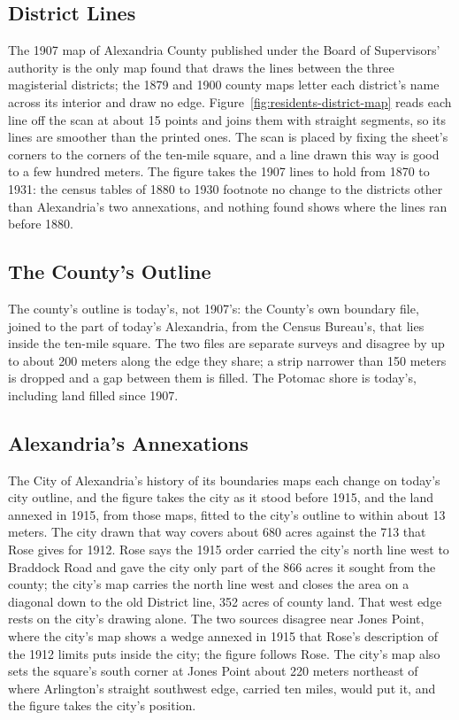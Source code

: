 \subsection{District Lines}
The 1907 map of Alexandria County published under the Board of Supervisors' authority
is the only map found that draws the lines between the three magisterial districts; the
1879 and 1900 county maps letter each district's name across its interior and draw no
edge.\autocite{noetzel1907} Figure~\ref{fig:residents-district-map} reads each line off
the scan at about 15 points and joins them with straight segments, so its lines are
smoother than the printed ones. The scan is placed by fixing the sheet's corners to the
corners of the ten-mile square, and a line drawn this way is good to a few hundred
meters. The figure takes the 1907 lines to hold from 1870 to 1931: the census tables of
1880 to 1930 footnote no change to the districts other than Alexandria's two
annexations, and nothing found shows where the lines ran before 1880.

\subsection{The County's Outline}
The county's outline is today's, not 1907's: the County's own boundary file, joined to
the part of today's Alexandria, from the Census Bureau's, that lies inside the ten-mile
square. The two files are separate surveys and disagree by up to about 200 meters along
the edge they share; a strip narrower than 150 meters is dropped and a gap between them
is filled. The Potomac shore is today's, including land filled since 1907.

\subsection{Alexandria's Annexations}
The City of Alexandria's history of its boundaries maps each change on today's city
outline, and the figure takes the city as it stood before 1915, and the land annexed in
1915, from those maps, fitted to the city's outline to within about 13
meters.\autocite[3]{alexandria2024} The city drawn that way covers about 680 acres
against the 713 that Rose gives for 1912.\autocite{rose1964} Rose says the 1915
order carried the city's north line west to Braddock Road and gave the city only part of
the 866 acres it sought from the county; the city's map carries the north line west and
closes the area on a diagonal down to the old District line, 352 acres of county land.
That west edge rests on the city's drawing alone. The two sources disagree near Jones Point, where the city's map shows a wedge
annexed in 1915 that Rose's description of the 1912 limits puts inside the city; the
figure follows Rose. The city's map also sets the square's south corner at Jones Point
about 220 meters northeast of where Arlington's straight southwest edge, carried ten
miles, would put it, and the figure takes the city's position.

